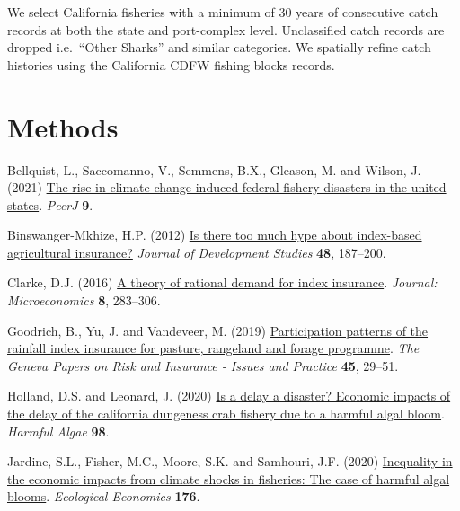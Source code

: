 \documentclass[
  letterpaper,
  DIV=11,
  numbers=noendperiod]{scrartcl}
\newlength{\cslhangindent}
\newlength{\cslentryspacingunit} %
\newenvironment{CSLReferences}[2] %
 {%
  \setlength{\parindent}{0pt}
  \ifodd #1
  \let\oldpar\par
  \def\par{\hangindent=\cslhangindent\oldpar}
  \fi
  \setlength{\parskip}{#2\cslentryspacingunit}
 }%
 {}
\begin{document}
We select California fisheries with a minimum of 30 years of consecutive
catch records at both the state and port-complex level. Unclassified
catch records are dropped i.e.~``Other Sharks'' and similar categories.
We spatially refine catch histories using the California CDFW fishing
blocks records.

\hypertarget{methods}{%
\section*{Methods}\label{methods}}

\hypertarget{refs}{}
\begin{CSLReferences}{1}{0}
\leavevmode{}%
Bellquist, L., Saccomanno, V., Semmens, B.X., Gleason, M. and Wilson, J.
(2021) \href{https://doi.org/10.7717/peerj.11186}{The rise in climate
change-induced federal fishery disasters in the united states}.
\emph{PeerJ} \textbf{9}.

\leavevmode{}%
Binswanger-Mkhize, H.P. (2012)
\href{https://doi.org/10.1080/00220388.2011.625411}{Is there too much
hype about index-based agricultural insurance?} \emph{Journal of
Development Studies} \textbf{48}, 187--200.

\leavevmode{}%
Clarke, D.J. (2016) \href{https://doi.org/10.1257/mic.20140103}{A theory
of rational demand for index insurance}. \emph{Journal: Microeconomics}
\textbf{8}, 283--306.

\leavevmode{}%
Goodrich, B., Yu, J. and Vandeveer, M. (2019)
\href{https://doi.org/10.1057/s41288-019-00149-3}{Participation patterns
of the rainfall index insurance for pasture, rangeland and forage
programme}. \emph{The Geneva Papers on Risk and Insurance - Issues and
Practice} \textbf{45}, 29--51.

\leavevmode{}%
Holland, D.S. and Leonard, J. (2020)
\href{https://doi.org/10.1016/j.hal.2020.101904}{Is a delay a disaster?
Economic impacts of the delay of the california dungeness crab fishery
due to a harmful algal bloom}. \emph{Harmful Algae} \textbf{98}.

\leavevmode{}%
Jardine, S.L., Fisher, M.C., Moore, S.K. and Samhouri, J.F. (2020)
\href{https://doi.org/10.1016/j.ecolecon.2020.106691}{Inequality in the
economic impacts from climate shocks in fisheries: The case of harmful
algal blooms}. \emph{Ecological Economics} \textbf{176}.


\end{CSLReferences}
\end{document}
